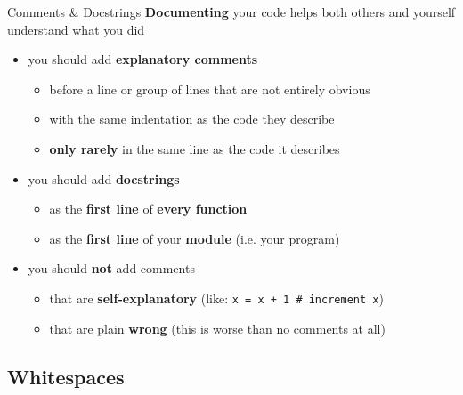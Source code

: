\begin{frame}{Comments \& Docstrings}
    \textbf{Documenting} your code helps both others and yourself understand what you did

    \begin{itemize}
        \item you should add \textbf{explanatory comments}
        \begin{itemize}
            \item before a line or group of lines that are not entirely obvious
            \item with the same indentation as the code they describe
            \item \textbf{only rarely} in the same line as the code it describes
        \end{itemize}
        \item you should add \textbf{docstrings}
        \begin{itemize}
            \item as the \textbf{first line} of \textbf{every function}
            \item as the \textbf{first line} of your \textbf{module} (i.e. your program)
        \end{itemize}
        \item you should \textbf{not} add comments
        \begin{itemize}
            \item that are \textbf{self-explanatory} (like: \texttt{x = x + 1   \# increment x})
            \item that are plain \textbf{wrong} (this is worse than no comments at all)
        \end{itemize}
    \end{itemize}
\end{frame}

\subsection{Whitespaces}


